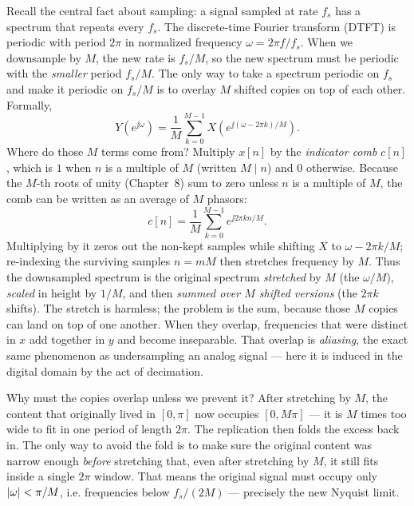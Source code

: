 Recall the central fact about sampling: a signal sampled at rate $f_s$ has a
spectrum that repeats every $f_s$. The discrete-time Fourier transform (DTFT)
is periodic with period $2\pi$ in normalized frequency $\omega = 2\pi f/f_s$.
When we downsample by $M$, the new rate is $f_s/M$, so the new spectrum must be
periodic with the \emph{smaller} period $f_s/M$. The only way to take a
spectrum periodic on $f_s$ and make it periodic on $f_s/M$ is to overlay $M$
shifted copies on top of each other. Formally,
\begin{equation}
  Y(e^{\jj\omega}) = \frac{1}{M}\sum_{k=0}^{M-1}
    X\!\left(e^{\jj(\omega - 2\pi k)/M}\right).
  \label{ch22:downspec}
\end{equation}
Where do those $M$ terms come from? Multiply $x[n]$ by the \emph{indicator comb} $c[n]$, which is $1$ when $n$ is a multiple of $M$ (written $M\mid n$) and $0$ otherwise. Because the $M$-th roots of unity (Chapter~8) sum to zero unless $n$ is a multiple of $M$, the comb can be written as an average of $M$ phasors:
\[
  c[n] = \frac{1}{M}\sum_{k=0}^{M-1} e^{\jj 2\pi k n/M}.
\]
Multiplying by it zeros out the non-kept samples while shifting $X$ to $\omega - 2\pi k/M$; re-indexing the surviving samples $n = mM$ then stretches frequency by $M$. Thus the downsampled spectrum is the original spectrum
\emph{stretched} by $M$ (the $\omega/M$), \emph{scaled} in height by $1/M$, and
then \emph{summed over $M$ shifted versions} (the $2\pi k$ shifts). The stretch
is harmless; the problem is the sum, because those $M$ copies can land on top
of one another. When they overlap, frequencies that were distinct in $x$ add
together in $y$ and become inseparable. That overlap is \emph{aliasing}, the
exact same phenomenon as undersampling an analog signal --- here it is induced
in the digital domain by the act of decimation.

\begin{whybox}
Why must the copies overlap unless we prevent it? After stretching by $M$, the
content that originally lived in $[0, \pi]$ now occupies $[0, M\pi]$ --- it is
$M$ times too wide to fit in one period of length $2\pi$. The replication then
folds the excess back in. The only way to avoid the fold is to make sure the
original content was narrow enough \emph{before} stretching that, even after
stretching by $M$, it still fits inside a single $2\pi$ window. That means the
original signal must occupy only $\lvert\omega\rvert < \pi/M$, i.e. frequencies below
$f_s/(2M)$ --- precisely the new Nyquist limit.
\end{whybox}

